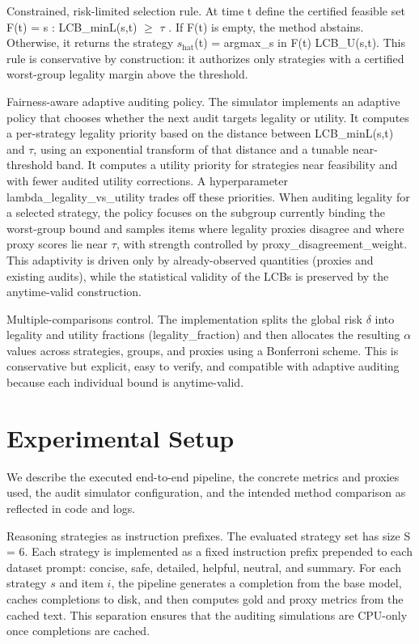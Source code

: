 \documentclass{article} %
\begin{document}
Constrained, risk-limited selection rule. At time t define the certified feasible set F(t) = { s : LCB_minL(s,t) \ensuremath{\geq} \ensuremath{\tau} }. If F(t) is empty, the method abstains. Otherwise, it returns the strategy $s_{\text{hat}}$(t) = argmax_{s in F(t)} LCB_U(s,t). This rule is conservative by construction: it authorizes only strategies with a certified worst-group legality margin above the threshold.

Fairness-aware adaptive auditing policy. The simulator implements an adaptive policy that chooses whether the next audit targets legality or utility. It computes a per-strategy legality priority based on the distance between LCB_minL(s,t) and \ensuremath{\tau}, using an exponential transform of that distance and a tunable near-threshold band. It computes a utility priority for strategies near feasibility and with fewer audited utility corrections. A hyperparameter lambda_legality_vs_utility trades off these priorities. When auditing legality for a selected strategy, the policy focuses on the subgroup currently binding the worst-group bound and samples items where legality proxies disagree and where proxy scores lie near \ensuremath{\tau}, with strength controlled by proxy_disagreement_weight. This adaptivity is driven only by already-observed quantities (proxies and existing audits), while the statistical validity of the LCBs is preserved by the anytime-valid construction.

Multiple-comparisons control. The implementation splits the global risk \ensuremath{\delta} into legality and utility fractions (legality_fraction) and then allocates the resulting \ensuremath{\alpha} values across strategies, groups, and proxies using a Bonferroni scheme. This is conservative but explicit, easy to verify, and compatible with adaptive auditing because each individual bound is anytime-valid.

\section{Experimental Setup}
\label{sec:experimental}
We describe the executed end-to-end pipeline, the concrete metrics and proxies used, the audit simulator configuration, and the intended method comparison as reflected in code and logs.

Reasoning strategies as instruction prefixes. The evaluated strategy set has size S = 6. Each strategy is implemented as a fixed instruction prefix prepended to each dataset prompt: concise, safe, detailed, helpful, neutral, and summary. For each strategy $s$ and item $i$, the pipeline generates a completion from the base model, caches completions to disk, and then computes gold and proxy metrics from the cached text. This separation ensures that the auditing simulations are CPU-only once completions are cached.
\end{document}
